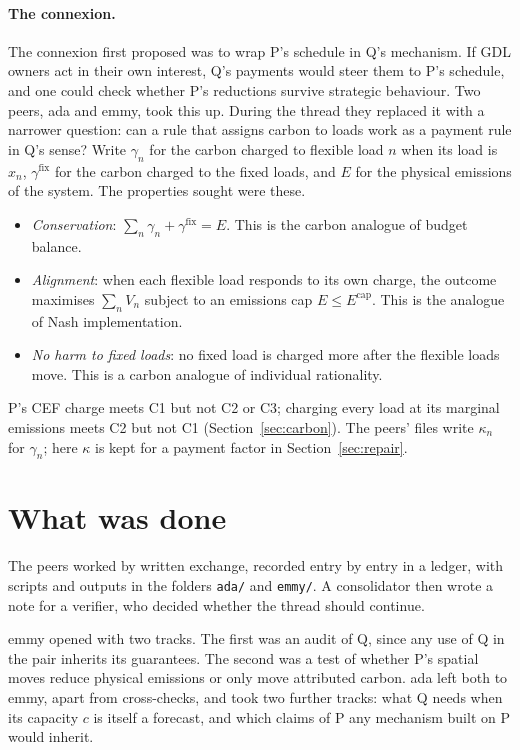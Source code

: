 \documentclass{article}
\begin{document}
\paragraph{The connexion.}
The connexion first proposed was to wrap P's schedule in Q's mechanism.
If GDL owners act in their own interest, Q's payments would steer them to P's schedule, and one could check whether P's reductions survive strategic behaviour.
Two peers, ada and emmy, took this up.
During the thread they replaced it with a narrower question: can a rule that assigns carbon to loads work as a payment rule in Q's sense?
Write \(\gamma_n\) for the carbon charged to flexible load \(n\) when its load is \(x_n\), \(\gamma^{\mathrm{fix}}\) for the carbon charged to the fixed loads, and \(E\) for the physical emissions of the system.
The properties sought were these.
\begin{itemize}
\item[(C1)] \emph{Conservation}: \(\sum_n\gamma_n+\gamma^{\mathrm{fix}}=E\). This is the carbon analogue of budget balance.
\item[(C2)] \emph{Alignment}: when each flexible load responds to its own charge, the outcome maximises \(\sum_nV_n\) subject to an emissions cap \(E\le E^{\mathrm{cap}}\). This is the analogue of Nash implementation.
\item[(C3)] \emph{No harm to fixed loads}: no fixed load is charged more after the flexible loads move. This is a carbon analogue of individual rationality.
\end{itemize}
P's CEF charge meets C1 but not C2 or C3; charging every load at its marginal emissions meets C2 but not C1 (Section~\ref{sec:carbon}).
The peers' files write \(\kappa_n\) for \(\gamma_n\); here \(\kappa\) is kept for a payment factor in Section~\ref{sec:repair}.

\section{What was done}\label{sec:done}

The peers worked by written exchange, recorded entry by entry in a ledger, with scripts and outputs in the folders \texttt{ada/} and \texttt{emmy/}.
A consolidator then wrote a note for a verifier, who decided whether the thread should continue.

emmy opened with two tracks.
The first was an audit of Q, since any use of Q in the pair inherits its guarantees.
The second was a test of whether P's spatial moves reduce physical emissions or only move attributed carbon.
ada left both to emmy, apart from cross-checks, and took two further tracks: what Q needs when its capacity \(c\) is itself a forecast, and which claims of P any mechanism built on P would inherit.
\end{document}
